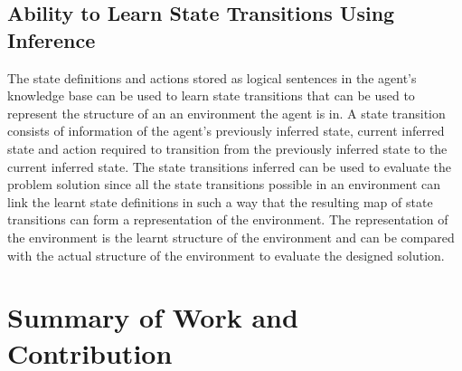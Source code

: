 
\subsection{Ability to Learn State Transitions Using Inference}
\label{obj_3:state_transitions}

The state definitions and actions stored as logical sentences in the agent's knowledge base can be used to learn state transitions that can be used to represent the structure of an an environment the agent is in. A state transition consists of information of the agent's previously inferred state, current inferred state and action required to transition from the previously inferred state to the current inferred state. The state transitions inferred can be used to evaluate the problem solution since all the state transitions possible in an environment can link the learnt state definitions in such a way that the resulting map of state transitions can form a representation of the environment. The representation of the environment is the learnt structure of the environment and can be compared with the actual structure of the environment to evaluate the designed solution.




\section{Summary of Work and Contribution}

